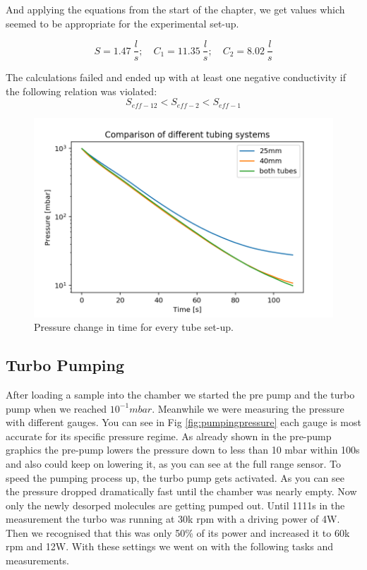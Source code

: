\documentclass[]{article}
\begin{document}
And applying the equations from the start of the chapter, we get values which seemed to be appropriate for the experimental set-up.

\[ S = 1.47 \:\frac{l}{s} ;\quad C_1 = 11.35 \:\frac{l}{s} ;\quad C_2 = 8.02 \:\frac{l}{s} \]

The calculations failed and ended up with at least one negative conductivity if the following relation was violated:
\[ S_{eff-12} < S_{eff-2} < S_{eff-1} \]

\begin{figure}[!h]
\centering\includegraphics[width=.75\textwidth]{Plots/Comparison.png}
\caption{Pressure change in time for every tube set-up.}
\label{fig::comparison}
\end{figure}


\subsection{Turbo Pumping}
After loading a sample into the chamber we started the pre pump and the turbo pump when we reached $10^{-1}mbar$. Meanwhile we were measuring the pressure with different gauges. You can see in Fig \ref{fig:pumpingpressure} each gauge is most accurate for its specific pressure regime.
As already shown in the pre-pump graphics the pre-pump lowers the pressure down to less than 10 mbar within 100s and also could keep on lowering it, as you can see at the full range sensor. To speed the pumping process up, the turbo pump gets activated. As you can see the pressure dropped dramatically fast until the chamber was nearly empty. Now only the newly desorped molecules are getting pumped out. Until 1111s in the measurement the turbo was running at 30k rpm with a driving power of 4W. Then we recognised that this was only 50\% of its power and increased it to 60k rpm and 12W. With these settings we went on with the following tasks and measurements.
\end{document}

